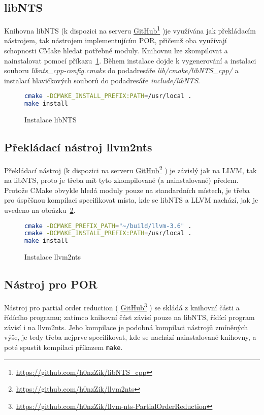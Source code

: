 \documentclass{fithesis2}
\newcommand\fnurl[2]{%
  \href{#2}{#1}\footnote{\url{#2}}%
}
\begin{document}
\subsection{libNTS}
Knihovna libNTS (k dispozici na serveru
\fnurl{GitHub}{https://github.com/h0nzZik/libNTS_cpp})je využívána jak překládacím nástrojem, tak nástrojem implementujícím POR, přičemž oba využívají schopnosti CMake hledat potřebné moduly. Knihovnu lze zkompilovat a nainstalovat pomocí příkazu~\ref{fig:experiments:nts-install}. Během instalace dojde k vygenerování a instalaci souboru \textit{libnts\_cpp-config.cmake} do podadresáře \textit{lib/cmake/libNTS\_cpp/} a instalací hlavičkových souborů do podadresáře \textit{include/libNTS}.
\begin{figure}[h!]
\begin{lstlisting}[language=bash]
cmake -DCMAKE_INSTALL_PREFIX:PATH=/usr/local .
make install
\end{lstlisting}
\caption{Instalace libNTS}
\label{fig:experiments:nts-install}
\end{figure}

\subsection{Překládací nástroj llvm2nts}
Překládací nástroj (k dispozici na serveru
\fnurl{GitHub}{https://github.com/h0nzZik/llvm2nts}) je závislý jak na LLVM, tak na libNTS, proto je třeba mít tyto zkompilované (a nainstalované) předem. Protože CMake obvykle hledá moduly pouze na standardních místech, je třeba pro úspěšnou kompilaci specifikovat místa, kde se libNTS a LLVM nachází, jak je uvedeno na obrázku~\ref{fig:experiments:llvm2nts-install}.
\begin{figure}[h!]
\begin{lstlisting}[language=bash]
cmake -DCMAKE_PREFIX_PATH="~/build/llvm-3.6" .
cmake -DCMAKE_INSTALL_PREFIX:PATH=/usr/local .
make install
\end{lstlisting}
\caption{Instalace llvm2nts}
\label{fig:experiments:llvm2nts-install}
\end{figure}

\subsection{Nástroj pro POR}
Nástroj pro partial order reduction (
\fnurl{GitHub}{https://github.com/h0nzZik/llvm-nts-PartialOrderReduction}) se skládá z knihovní části a řídícího programu; zatímco knihovní část závisí pouze na libNTS, řídící program závisí i na llvm2nts. Jeho kompilace je podobná kompilaci nástrojů zmíněných výše, je tedy třeba nejprve specifikovat, kde se nachází nainstalované knihovny, a poté spustit kompilaci příkazem \lstinline{make}.
\end{document}
